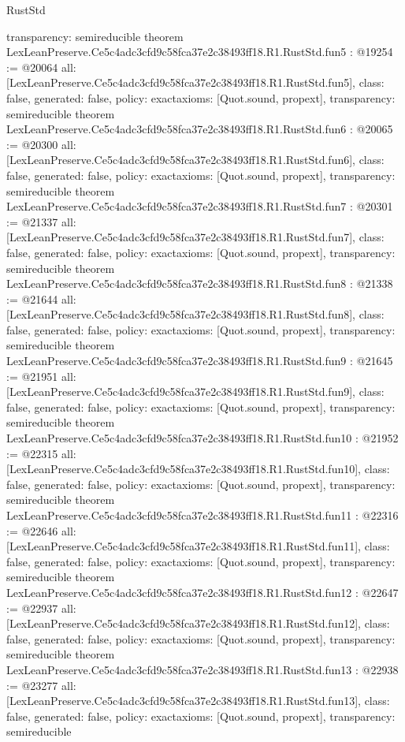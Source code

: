 \begin{lexlean}{RustStd}
\begin{coremodule}
{  transparency: semireducible
}
theorem LexLeanPreserve.Ce5c4adc3cfd9c58fca37e2c38493ff18.R1.RustStd.fun5 : @19254 := @20064 {
  all: [LexLeanPreserve.Ce5c4adc3cfd9c58fca37e2c38493ff18.R1.RustStd.fun5],
  class: false,
  generated: false,
  policy: exact{axioms: [Quot.sound, propext]},
  transparency: semireducible
}
theorem LexLeanPreserve.Ce5c4adc3cfd9c58fca37e2c38493ff18.R1.RustStd.fun6 : @20065 := @20300 {
  all: [LexLeanPreserve.Ce5c4adc3cfd9c58fca37e2c38493ff18.R1.RustStd.fun6],
  class: false,
  generated: false,
  policy: exact{axioms: [Quot.sound, propext]},
  transparency: semireducible
}
theorem LexLeanPreserve.Ce5c4adc3cfd9c58fca37e2c38493ff18.R1.RustStd.fun7 : @20301 := @21337 {
  all: [LexLeanPreserve.Ce5c4adc3cfd9c58fca37e2c38493ff18.R1.RustStd.fun7],
  class: false,
  generated: false,
  policy: exact{axioms: [Quot.sound, propext]},
  transparency: semireducible
}
theorem LexLeanPreserve.Ce5c4adc3cfd9c58fca37e2c38493ff18.R1.RustStd.fun8 : @21338 := @21644 {
  all: [LexLeanPreserve.Ce5c4adc3cfd9c58fca37e2c38493ff18.R1.RustStd.fun8],
  class: false,
  generated: false,
  policy: exact{axioms: [Quot.sound, propext]},
  transparency: semireducible
}
theorem LexLeanPreserve.Ce5c4adc3cfd9c58fca37e2c38493ff18.R1.RustStd.fun9 : @21645 := @21951 {
  all: [LexLeanPreserve.Ce5c4adc3cfd9c58fca37e2c38493ff18.R1.RustStd.fun9],
  class: false,
  generated: false,
  policy: exact{axioms: [Quot.sound, propext]},
  transparency: semireducible
}
theorem LexLeanPreserve.Ce5c4adc3cfd9c58fca37e2c38493ff18.R1.RustStd.fun10 : @21952 := @22315 {
  all: [LexLeanPreserve.Ce5c4adc3cfd9c58fca37e2c38493ff18.R1.RustStd.fun10],
  class: false,
  generated: false,
  policy: exact{axioms: [Quot.sound, propext]},
  transparency: semireducible
}
theorem LexLeanPreserve.Ce5c4adc3cfd9c58fca37e2c38493ff18.R1.RustStd.fun11 : @22316 := @22646 {
  all: [LexLeanPreserve.Ce5c4adc3cfd9c58fca37e2c38493ff18.R1.RustStd.fun11],
  class: false,
  generated: false,
  policy: exact{axioms: [Quot.sound, propext]},
  transparency: semireducible
}
theorem LexLeanPreserve.Ce5c4adc3cfd9c58fca37e2c38493ff18.R1.RustStd.fun12 : @22647 := @22937 {
  all: [LexLeanPreserve.Ce5c4adc3cfd9c58fca37e2c38493ff18.R1.RustStd.fun12],
  class: false,
  generated: false,
  policy: exact{axioms: [Quot.sound, propext]},
  transparency: semireducible
}
theorem LexLeanPreserve.Ce5c4adc3cfd9c58fca37e2c38493ff18.R1.RustStd.fun13 : @22938 := @23277 {
  all: [LexLeanPreserve.Ce5c4adc3cfd9c58fca37e2c38493ff18.R1.RustStd.fun13],
  class: false,
  generated: false,
  policy: exact{axioms: [Quot.sound, propext]},
  transparency: semireducible
}
\end{coremodule}
\end{lexlean}
